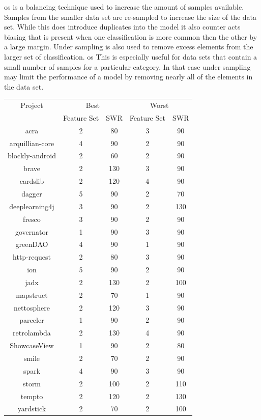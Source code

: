 \gls{os} is a balancing technique used to increase the amount of samples available. Samples from the smaller data set are re-sampled to increase the size of the data set. While this does introduce duplicates into the model it also counter acts biasing that is present when one classification is more common then the other by a large margin. Under sampling is also used to remove excess elements from the larger set of classification. \gls{os} This is especially useful for data sets that contain a small number of samples for a particular category. In that case under sampling may limit the performance of a model by removing nearly all of the elements in the data set.

\begin{table}[ht]
\begin{center}

    \begin{tabular}{|c|c|c|c|c|}
        \hline
        Project & \multicolumn{2}{c|}{Best} & \multicolumn{2}{c|}{Worst} \\ \cline{2-5}
         & Feature Set & SWR & Feature Set & SWR \\ 
        \hline
        acra & 2 & 80 & 3 & 90 \\
        arquillian-core & 4 & 90 & 2 & 90 \\
        blockly-android & 2 & 60 & 2 & 90 \\
        brave & 2 & 130 & 3 & 90 \\
        cardslib & 2 & 120 & 4 & 90 \\
        dagger & 5 & 90 & 2 & 70 \\
        deeplearning4j & 3 & 90 & 2 & 130 \\
        fresco & 3 & 90 & 2 & 90 \\
        governator & 1 & 90 & 3 & 90 \\
        greenDAO & 4 & 90 & 1 & 90 \\
        http-request & 2 & 80 & 3 & 90 \\
        ion & 5 & 90 & 2 & 90 \\
        jadx & 2 & 130 & 2 & 100 \\
        mapstruct & 2 & 70 & 1 & 90 \\
        nettosphere & 2 & 120 & 3 & 90 \\
        parceler & 1 & 90 & 2 & 90 \\
        retrolambda & 2 & 130 & 4 & 90 \\
        ShowcaseView & 1 & 90 & 2 & 80 \\
        smile & 2 & 70 & 2 & 90 \\
        spark & 4 & 90 & 3 & 90 \\
        storm & 2 & 100 & 2 & 110 \\
        tempto & 2 & 120 & 2 & 130 \\
        yardstick & 2 & 70 & 2 & 100 \\



\end{tabular}
\end{center}
\end{table}
